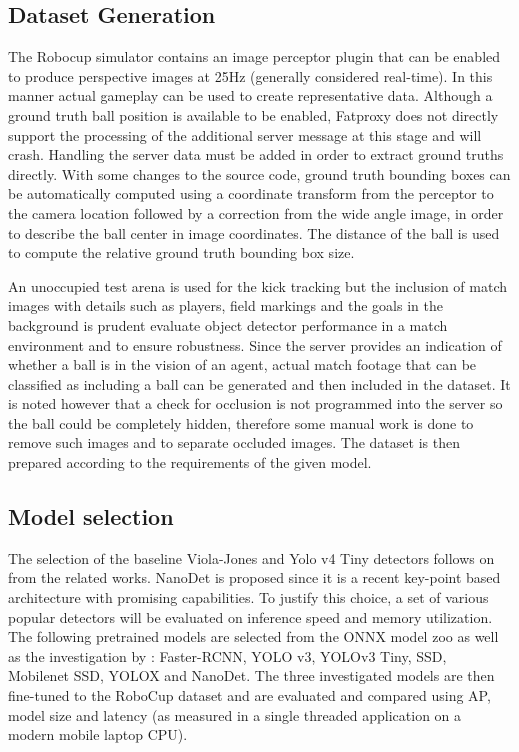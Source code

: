 \documentclass[a4paper,twoside,12pt]{report}
\begin{document}
\subsection{Dataset Generation}

The Robocup simulator contains an image perceptor plugin that can be enabled to produce perspective images at 25Hz (generally considered real-time). In this manner actual gameplay can be used to create representative data. Although a ground truth ball position is available to be enabled, Fatproxy does not directly support the processing of the additional server message at this stage and will crash. Handling the server data must be added in order to extract ground truths directly. With some changes to the source code, ground truth bounding boxes can be automatically computed using a coordinate transform from the perceptor to the camera location followed by a correction from the wide angle image, in order to describe the ball center in image coordinates. The distance of the ball is used to compute the relative ground truth bounding box size.

An unoccupied test arena is used for the kick tracking but the inclusion of match images with details such as players, field markings and the goals in the background is prudent evaluate object detector performance in a match environment and to ensure robustness. Since the server provides an indication of whether a ball is in the vision of an agent, actual match footage that can be classified as including a ball can be generated and then included in the dataset. It is noted however that a check for occlusion is not programmed into the server so the ball could be completely hidden, therefore some manual work is done to remove such images and to separate occluded images. The dataset is then prepared according to the requirements of the given model.

\subsection{Model selection}

The selection of the baseline Viola-Jones and Yolo v4 Tiny detectors follows on from the related works. NanoDet is proposed since it is a recent key-point based architecture with promising capabilities. To justify this choice, a set of various popular detectors will be evaluated on inference speed and memory utilization. The following pretrained models are selected from the ONNX model zoo \citep{modelzoo} as well as the investigation by \cite{comprehensive}: Faster-RCNN, YOLO v3, YOLOv3 Tiny, SSD, Mobilenet SSD, YOLOX and NanoDet. The three investigated models are then fine-tuned to the RoboCup dataset and are evaluated and compared using AP, model size and latency (as measured in a single threaded application on a modern mobile laptop CPU).
\end{document}
